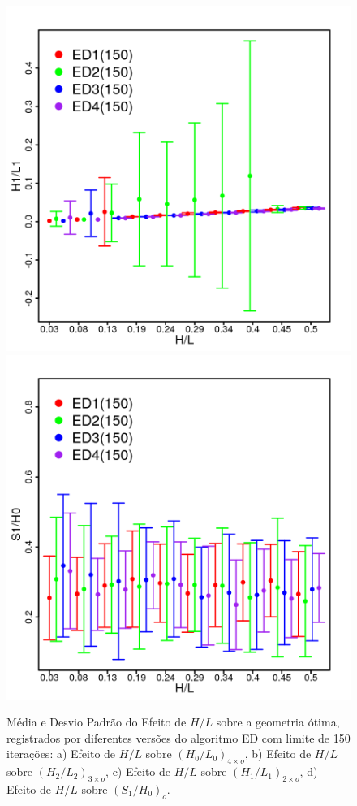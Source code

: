 \documentclass[12pt,A4,A4pt]{article}
\begin{document}
\begin{figure}[htbp]
\quad
\includegraphics[scale=.91]{imgs/plot_deall150_rdata_std_h1l1.png}
\quad
\includegraphics[scale=.91]{imgs/plot_deall150_rdata_std_s1h0.png}

\caption{\fontsize{10pt}{\baselineskip}\selectfont Média e Desvio Padrão do Efeito de $H/L$ sobre a geometria ótima, registrados por diferentes versões do algoritmo ED com limite de 150 iterações: a) Efeito de $H/L$ sobre ${(H_{0}/L_{0})_{4\times o}}$, b) Efeito de $H/L$ sobre ${(H_{2}/L_{2})_{3\times o}}$, c) Efeito de $H/L$ sobre ${(H_{1}/L_{1})_{2\times o}}$, d) Efeito de $H/L$ sobre ${(S_{1}/H_{0})_{o}}$.}
\label{stddegls}
\end{figure}
\end{document}
